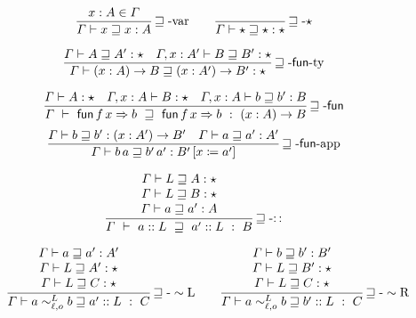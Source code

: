 \begin{figure}

\begin{align*}
 \frac{x:A\in\varGamma}{\varGamma\vdash x\sqsupseteq x:A}\rulename{\sqsupseteq-var}
  \quad & \quad 
  \frac{\ }{\varGamma\vdash\star\sqsupseteq\star:\star}\rulename{\sqsupseteq-\star}
  \\
\end{align*}

\[
\frac{
\varGamma\vdash A\sqsupseteq A':\star \quad
\varGamma,x:A'\vdash B\sqsupseteq B':\star
}{
  \varGamma\vdash\left(x:A\right)\rightarrow B\sqsupseteq\left(x:A'\right)\rightarrow B':\star
}\operatorname{\sqsupseteq-\mathsf{fun}-ty}
\]

\[
\frac{
\varGamma\vdash A:\star\quad\varGamma,x:A\vdash B:\star \quad
\varGamma,x:A\vdash b\sqsupseteq b':B
}{
  \varGamma\ \vdash\ \mathsf{fun}\,f\,x\Rightarrow b\ \sqsupseteq\ \mathsf{fun}\,f\,x\Rightarrow b\ :\ \left(x:A\right)\rightarrow B
}\rulename{\sqsupseteq-\mathsf{fun}}
\]
\[
\frac{
\varGamma\vdash b\sqsupseteq b':\left(x:A'\right)\rightarrow B' \quad
\varGamma\vdash a\sqsupseteq a':A'
}{
  \varGamma\vdash b\,a\sqsupseteq b'\,a':B'\left[x\coloneqq a'\right]
}\operatorname{\sqsupseteq-\mathsf{fun}-app}
\]

\[
\frac{\begin{array}{c}
  \varGamma\vdash L\sqsupseteq A:\star\\
  \varGamma\vdash L\sqsupseteq B:\star\\
  \varGamma\vdash a\sqsupseteq a':A
  \end{array}}{\varGamma\ \vdash\ a::L\ \sqsupseteq\ a'::L\ :\ B}\rulename{\sqsupseteq-::}
\]

\begin{align*}
  \frac{\begin{array}{c}
  \varGamma\vdash a\sqsupseteq a':A'\\
  \varGamma\vdash L\sqsupseteq A':\star\\
  \varGamma\vdash L\sqsupseteq C:\star
  \end{array}}{\varGamma\vdash a\sim_{\ell,o}^{L}b\sqsupseteq a'::L\ :\ C}\rulename{\sqsupseteq-\sim L}
  \quad & \quad 
  \frac{\begin{array}{c}
  \varGamma\vdash b\sqsupseteq b':B'\\
  \varGamma\vdash L\sqsupseteq B':\star\\
  \varGamma\vdash L\sqsupseteq C:\star
  \end{array}}{\varGamma\vdash a\sim_{\ell,o}^{L}b\sqsupseteq b'::L\ :\ C}\rulename{\sqsupseteq-\sim R}
\\
\end{align*}


\end{figure}
